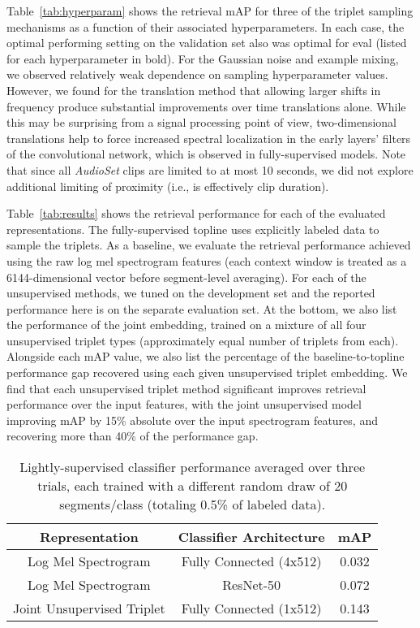 \documentclass{article}
\begin{document}
Table~\ref{tab:hyperparam} shows the retrieval mAP for three of the triplet
sampling mechanisms as a function of their associated hyperparameters.   In each
case, the optimal performing setting on the validation set also was optimal for
eval (listed for each hyperparameter in bold).  For the Gaussian noise and
example mixing, we observed relatively weak dependence on sampling
hyperparameter values.  However, we found for the translation method that
allowing larger shifts in frequency produce substantial improvements over time
translations alone.  While this may be surprising from a signal processing point
of view, two-dimensional translations help to force increased spectral
localization in the early layers' filters of the convolutional network, which is
observed in fully-supervised models.  Note that since all \emph{AudioSet} clips
are limited to at most 10 seconds, we did not explore additional limiting of
proximity (i.e.,  is effectively clip duration).

Table~\ref{tab:results} shows the retrieval performance for each of the
evaluated representations.  The fully-supervised topline uses explicitly labeled
data to sample the triplets.  As a baseline, we evaluate the retrieval
performance achieved using the raw log mel spectrogram features (each
 context window is treated as a 6144-dimensional vector before
segment-level averaging).  For each of the unsupervised methods, we tuned on the
development set and the reported performance here is on the separate evaluation
set.  At the bottom, we also list the performance of the joint embedding,
trained on a mixture of all four unsupervised triplet types (approximately equal
number of triplets from each).  Alongside each mAP value, we also list the
percentage of the baseline-to-topline performance gap recovered using each given
unsupervised triplet embedding.  We find that each unsupervised triplet method
significant improves retrieval performance over the input features, with the
joint unsupervised model improving mAP by 15\% absolute over the input
spectrogram features, and recovering more than 40\% of the performance gap.

\begin{table}
\vspace{-0.2cm}
  \centering
  \caption{Lightly-supervised classifier performance averaged over three trials,
    each trained with a different random draw of 20 segments/class (totaling
    0.5\% of labeled data).}
  \label{tab:light}
    \vspace{0.2cm}
  \begin{tabular}{c|c|c}
    \hline  \hline
    Representation & Classifier Architecture & mAP \\
    \hline  \hline
    Log Mel Spectrogram & Fully Connected (4x512) & 0.032 \\
    Log Mel Spectrogram & ResNet-50               & 0.072 \\
    \hline
    Joint Unsupervised Triplet & Fully Connected (1x512) & 0.143 \\
    \hline  \hline
  \end{tabular}
\vspace{-0.2cm}
\end{table}
\end{document}
